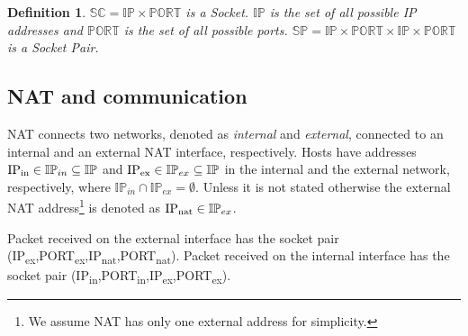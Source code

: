 \documentclass{acm_proc_article-sp}
\newtheorem{mydef}{Definition}
\begin{document}
\begin{mydef}
$\mathbb{SC} = \mathbb{IP} \times \mathbb{PORT}$
 is a Socket. $\mathbb{IP}$ is the set of all possible IP addresses and $\mathbb{PORT}$ 
is the set of all possible ports. %
$\mathbb{SP} = \mathbb{IP} \times \mathbb{PORT} \times \mathbb{IP} \times \mathbb{PORT}$
 is a Socket Pair.
\end{mydef}
% 

\subsection{NAT and communication}
NAT connects two networks, denoted as {\em internal} and {\em external}, connected to an internal and an external NAT interface, respectively.
Hosts have addresses $\text{IP\textsubscript{in}} \in \mathbb{IP}_{in} \subseteq \mathbb{IP}$ 
and $\text{IP\textsubscript{ex}} \in \mathbb{IP}_{ex} \subseteq \mathbb{IP}$ in the internal and the external network,
respectively, where $\mathbb{IP}_{in} \cap \mathbb{IP}_{ex} = \emptyset$.
Unless it is not stated otherwise the external NAT address\footnote{We assume NAT has only one external address for simplicity.} is denoted as 
$\text{IP\textsubscript{nat}} \in \mathbb{IP}_{ex}$.

Packet received on the external interface has the socket pair {(IP\textsubscript{ex},PORT\textsubscript{ex},IP\textsubscript{nat},PORT\textsubscript{nat})}.
Packet received on the internal interface has the socket pair {(IP\textsubscript{in},PORT\textsubscript{in},IP\textsubscript{ex},PORT\textsubscript{ex})}.
\end{document}
